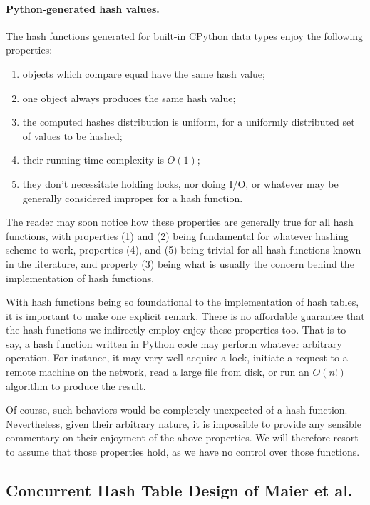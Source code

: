 \paragraph{Python-generated hash values.}
The hash functions generated for built-in CPython data types enjoy the following properties:
\begin{enumerate}
	\item objects which compare equal have the same hash value;
	\item one object always produces the same hash value;
	\item the computed hashes distribution is uniform, for a uniformly distributed set of values to be hashed;
	\item their running time complexity is $O(1)$;
	\item they don't necessitate holding locks, nor doing I/O, or whatever may be generally considered improper for a hash function\@.
\end{enumerate}
The reader may soon notice how these properties are generally true for all hash functions, with properties (1) and (2) being fundamental for whatever hashing scheme to work, properties (4), and (5) being trivial for all hash functions known in the literature, and property (3) being what is usually the concern behind the implementation of hash functions.

With hash functions being so foundational to the implementation of hash tables, it is important to make one explicit remark.
There is no affordable guarantee that the hash functions we indirectly employ enjoy these properties too.
That is to say, a hash function written in Python code may perform whatever arbitrary operation.
For instance, it may very well acquire a lock, initiate a request to a remote machine on the network, read a large file from disk, or run an $O(n!)$ algorithm to produce the result.

Of course, such behaviors would be completely unexpected of a hash function.
Nevertheless, given their arbitrary nature, it is impossible to provide any sensible commentary on their enjoyment of the above properties.
We will therefore resort to assume that those properties hold, as we have no control over those functions.


\subsection{Concurrent Hash Table Design of Maier et al.}\label{subsec:maier}

